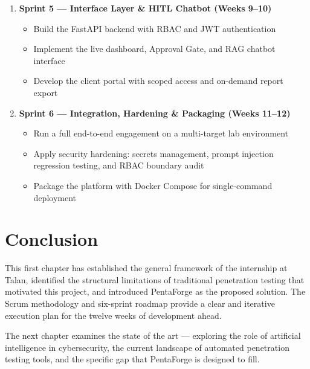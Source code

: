 \documentclass[12pt,a4paper]{report}
\begin{document}
\begin{enumerate}
    \item \textbf{Sprint 5 --- Interface Layer \& HITL Chatbot (Weeks 9--10)}
    \begin{itemize}
        \item Build the FastAPI backend with RBAC and JWT authentication
        \item Implement the live dashboard, Approval Gate, and RAG chatbot interface
        \item Develop the client portal with scoped access and on-demand report export
    \end{itemize}

    \item \textbf{Sprint 6 --- Integration, Hardening \& Packaging (Weeks 11--12)}
    \begin{itemize}
        \item Run a full end-to-end engagement on a multi-target lab environment
        \item Apply security hardening: secrets management, prompt injection
        regression testing, and RBAC boundary audit
        \item Package the platform with Docker Compose for single-command deployment
    \end{itemize}
\end{enumerate}

\section*{Conclusion}

This first chapter has established the general framework of the internship at Talan,
identified the structural limitations of traditional penetration testing that motivated
this project, and introduced PentaForge as the proposed solution. The Scrum methodology
and six-sprint roadmap provide a clear and iterative execution plan for the twelve
weeks of development ahead.

The next chapter examines the state of the art --- exploring the role of artificial
intelligence in cybersecurity, the current landscape of automated penetration testing
tools, and the specific gap that PentaForge is designed to fill.

\pagestyle{fancy}
\newpage
\pagestyle{chaptertwo}

\vspace*{4cm}
\end{document}
